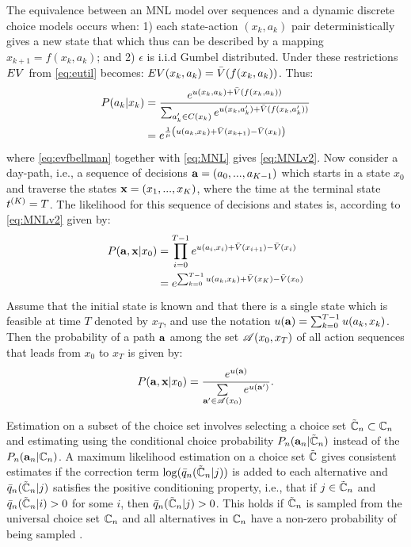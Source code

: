 The equivalence between an MNL model over sequences and a dynamic discrete choice models occurs when: 1) each state-action $(x_{k},a_{k})$ pair deterministically gives a new state that which thus can be described by a mapping $x_{k+1}=f(x_{k},a_{k})$; and 2) $\epsilon$ is i.i.d Gumbel distributed. Under these restrictions $EV$ from \eqref{eq:eutil} becomes: $EV(x_{k},a_{k})=\bar{V}(f(x_{k},a_{k}))$. Thus:
\begin{align}
P(a_k|x_k) &= \frac{e^{\avgu(x_k,a_k) + \ev(f(x_{k},a_{k}))}}{\sum_{a'_{k} \in C(x_k)}e^{\avgu(x_k,a'_{k}) + \ev(f(x_k,a'_{k}))}} \label{eq:MNL}\\
&=e^{\frac{1}{\mu}\left(\avgu(a_k,x_k) + \ev(x_{k+1})- \ev(x_k)\right)}\label{eq:MNLv2}
\end{align}
where \eqref{eq:evfbellman} together with \eqref{eq:MNL} gives \eqref{eq:MNLv2}. Now consider a day-path, i.e., a sequence of decisions  ${\bf a} = (a_0,...,a_{K-1})$ which starts in a state $x_0$ and traverse the states ${\bf x} = (x_1,...,x_{K})$, where the time at the terminal state $t^{(K)}=T$. The likelihood for this sequence of decisions and states is, according to \eqref{eq:MNLv2} given by:
\begin{equation}\label{eq:pPath0}
\begin{aligned}
P(\ve{a},\ve{x}|x_0)
& = \prod_{i=0}^{T-1} e^{\avgu(a_i,x_i) + \ev(x_{i+1})-\ev(x_i)} \\
& =  e^{\sum_{k=0}^{T-1} \avgu(a_k,x_k) + \ev(x_{K})-\ev(x_0)} 
\end{aligned}
\end{equation}
Assume that the initial state is known and that there is a single state which is feasible at time $T$ denoted by $x_T$, and use the notation $u({\bf a})=\sum_{k=0}^{T-1} u(a_k,x_k)$. Then the probability of a path ${\bf a}$ among the set $\mathscr{A}(x_0,x_T)$ of all action sequences that leads from $x_0$ to $x_T$ is given by:
\begin{equation}
P(\ve{a},\ve{x}|x_0) = \frac{e^{u(\ve{a})}}{\sum\limits_{\ve{a'} \in \Agood(x_0)}e^{u(\ve{a'})} }.
\end{equation}

Estimation on a subset of the choice set involves selecting a choice set $\tilde{\mathbb{C}}_n \subset \mathbb{C}_n$ and estimating using the conditional choice probability $P_n({\bf a}_n|\tilde{\mathbb{C}}_n)$ instead of the $P_n({\bf a}_n|\mathbb{C}_n)$. A maximum likelihood estimation on a choice set $\tilde{\mathbb{C}}$ gives consistent estimates if the correction term $\log(\bar{q}_n(\tilde{\mathbb{C}}_n|j))$ is added to each alternative and $\bar{q}_n(\tilde{\mathbb{C}}_n|j)$ satisfies the positive conditioning property, i.e., that if $j\in \tilde{\mathbb{C}}_n$ and $\bar{q}_n(\tilde{\mathbb{C}}_n|i)>0$ for some $i$, then $\bar{q}_n(\tilde{\mathbb{C}}_n|j)>0$. This holds if $\tilde{\mathbb{C}}_n$ is sampled from the universal choice set $\mathbb{C}_n$ and all alternatives in $\mathbb{C}_n$ have a non-zero probability of being sampled \citep{mcfadden1978}. 

